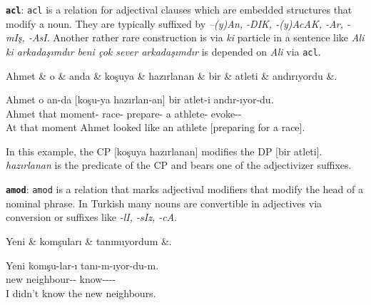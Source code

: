 \documentclass[11pt,a4paper]{article}
\begin{document}
\textbf{\texttt{acl}}:
\texttt{acl} is a relation for adjectival clauses which are embedded structures that modify a noun. They are typically suffixed by \textit{–(y)An, -DIK, -(y)AcAK, -Ar, -mIş, -AsI}. Another rather rare construction is via \textit{ki} particle in a sentence like \textit{Ali ki arkadaşımdır beni çok sever arkadaşımdır} is depended on \textit{Ali} via \texttt{acl}.

\begin{exe}
\ex \label{acl}
\begin{dependency}
\begin{deptext}[column sep=0.32cm]
Ahmet \& o \& anda \& koşuya \& hazırlanan \& bir \& atleti \& andırıyordu \&. \\
\end{deptext}
\end{dependency}
\gll Ahmet o an-da [koşu-ya hazırlan-an] bir atlet-i andır-ıyor-du. \\
Ahmet that moment-\Loc{} race-\Dat{} prepare-\Ptcp{} a athlete-\Acc{} evoke-\Prog{}-\Pst{}\\
\glt At that moment Ahmet looked like an athlete [preparing for a race].
\end{exe}

In this example, the CP [koşuya hazırlanan] modifies the DP [bir atleti]. \textit{hazırlanan} is the predicate of the CP and bears one of the adjectivizer suffixes.

\textbf{\texttt{amod}}:
\texttt{amod} is a relation that marks adjectival modifiers that modify the head of a nominal phrase. In Turkish many nouns are convertible in adjectives via conversion or suffixes like \textit{-lI, -sIz, -cA}.

\begin{exe}
\ex \label{amod}
\begin{dependency}
\begin{deptext}[column sep=0.22cm]
Yeni \& komşuları \& tanımıyordum \&. \\
\end{deptext}
\end{dependency}
\gll Yeni komşu-lar-ı tanı-m-ıyor-du-m.  \\
new neighbour-\Pl{}-\Acc{} know-\Neg{}-\Prog{}-\Pst{}-\Fsg{}\\
\glt I didn’t know the new neighbours.
\end{exe}
\end{document}
